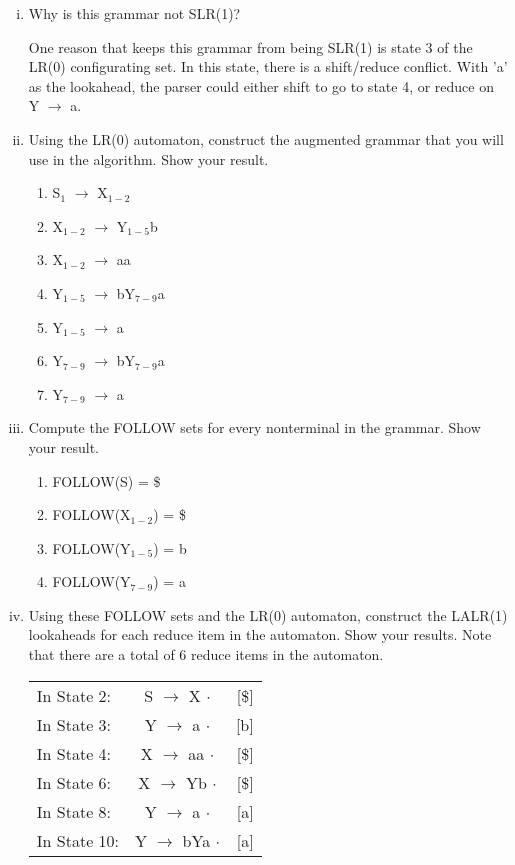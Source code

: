 \documentclass{article}
\begin{document}
\begin{enumerate}[i.]
	\item Why is this grammar not SLR(1)?

		One reason that keeps this grammar from being SLR(1) is state 3
		of the LR(0) configurating set. In this state, there is a
		shift/reduce conflict. With 'a' as the lookahead, the parser
		could either shift to go to state 4, or reduce on Y $\to$ a.

	\item Using the LR(0) automaton, construct the augmented grammar that
		you will use in the algorithm. Show your result.

		\begin{enumerate}[(1)]
			\item S$_1$ $\to$ X$_{1-2}$
			\item X$_{1-2}$ $\to$ Y$_{1-5}$b
			\item X$_{1-2}$ $\to$ aa
			\item Y$_{1-5}$ $\to$ bY$_{7-9}$a
			\item Y$_{1-5}$ $\to$ a
			\item Y$_{7-9}$ $\to$ bY$_{7-9}$a
			\item Y$_{7-9}$ $\to$ a
		\end{enumerate}

	\item Compute the FOLLOW sets for every nonterminal in the grammar.
		Show your result.

		\begin{enumerate}[(1)]
			\item FOLLOW(S) = \$
			\item FOLLOW(X$_{1-2}$) = \$
			\item FOLLOW(Y$_{1-5}$) = b
			\item FOLLOW(Y$_{7-9}$) = a
		\end{enumerate}

	\item Using these FOLLOW sets and the LR(0) automaton, construct the
		LALR(1) lookaheads for each reduce item in the automaton. Show
		your results. Note that there are a total of 6 reduce items in
		the automaton.

		\begin{tabular}{lcr}
			In State  2: & S $\to$  X  $\cdot$ & [\$] \\
			In State  3: & Y $\to$  a  $\cdot$ & [b]  \\
			In State  4: & X $\to$ aa  $\cdot$ & [\$] \\
			In State  6: & X $\to$ Yb  $\cdot$ & [\$] \\
			In State  8: & Y $\to$  a  $\cdot$ & [a]  \\
			In State 10: & Y $\to$ bYa $\cdot$ & [a]  \\
		\end{tabular}


\end{enumerate}
\end{document}
